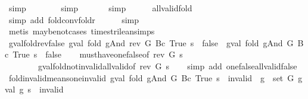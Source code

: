 \begin{isabellebody}
\ simp\isanewline
\ \ \ \ \ \ \isamarkupfalse%
\ simp\isanewline
\ \ \ \ \ \isamarkupfalse%
\ simp\isanewline
\ \ \ \ \isamarkupfalse%
\ all{\isacharunderscore}valid{\isacharunderscore}fold\isanewline
\ \ \ \ \ \isamarkupfalse%
\ {\isacharparenleft}simp\ add{\isacharcolon}\ fold{\isacharunderscore}conv{\isacharunderscore}foldr{\isacharparenright}\isanewline
\ \ \ \ \isamarkupfalse%
\ simp\isanewline
\ \ \ \ \isamarkupfalse%
\ {\isacharparenleft}metis\ maybe{\isacharunderscore}not{\isachardot}cases\ times{\isacharunderscore}trilean{\isachardot}simps{\isacharparenleft}{}{\isacharparenright}{\isacharparenright}\isanewline
{}\isamarkupfalse%
%
\endisatagproof
{\isafoldproof}%
%
\isadelimproof
\isanewline
%
\endisadelimproof
\isanewline
{}\isamarkupfalse%
\ gval{\isacharunderscore}fold{\isacharunderscore}rev{\isacharunderscore}false{\isacharcolon}\ {\isachardoublequoteopen}gval\ {\isacharparenleft}fold\ gAnd\ {\isacharparenleft}rev\ G{\isacharparenright}\ {\isacharparenleft}Bc\ True{\isacharparenright}{\isacharparenright}\ s\ {\isacharequal}\ false\ {\isasymLongrightarrow}\ gval\ {\isacharparenleft}fold\ gAnd\ G\ {\isacharparenleft}Bc\ True{\isacharparenright}{\isacharparenright}\ s\ {\isacharequal}\ false{\isachardoublequoteclose}\isanewline
%
\isadelimproof
\ \ %
\endisadelimproof
%
\isatagproof
{}\isamarkupfalse%
\ must{\isacharunderscore}have{\isacharunderscore}one{\isacharunderscore}false{\isacharbrackleft}of\ {\isachardoublequoteopen}rev\ G{\isachardoublequoteclose}\ s{\isacharbrackright}\isanewline
\ \ \ \ \ \ \ \ gval{\isacharunderscore}fold{\isacharunderscore}not{\isacharunderscore}invalid{\isacharunderscore}all{\isacharunderscore}valid{\isacharbrackleft}of\ {\isachardoublequoteopen}rev\ G{\isachardoublequoteclose}\ s{\isacharbrackright}\isanewline
\ \ \isamarkupfalse%
\ {\isacharparenleft}simp\ add{\isacharcolon}\ one{\isacharunderscore}false{\isacharunderscore}all{\isacharunderscore}valid{\isacharunderscore}false{\isacharparenright}%
\endisatagproof
{\isafoldproof}%
%
\isadelimproof
\isanewline
%
\endisadelimproof
\isanewline
{}\isamarkupfalse%
\ fold{\isacharunderscore}invalid{\isacharunderscore}means{\isacharunderscore}one{\isacharunderscore}invalid{\isacharcolon}\ {\isachardoublequoteopen}gval\ {\isacharparenleft}fold\ gAnd\ G\ {\isacharparenleft}Bc\ True{\isacharparenright}{\isacharparenright}\ s\ {\isacharequal}\ invalid\ {\isasymLongrightarrow}\ {\isasymexists}g\ {\isasymin}\ set\ G{\isachardot}\ gval\ g\ s\ {\isacharequal}\ invalid{\isachardoublequoteclose}\isanewline

\end{isabellebody}
